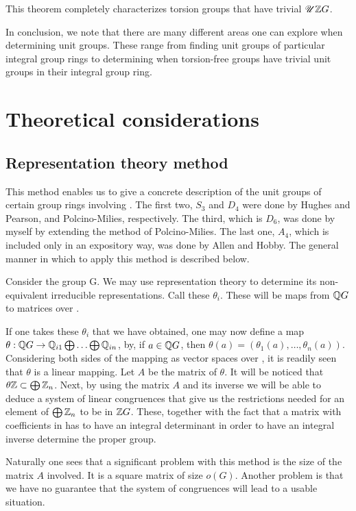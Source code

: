 \documentclass[11pt]{report}
\begin{document}
This theorem completely characterizes torsion groups that have trivial
\(\mathscr{U} \mathbb{Z}{}G\).

In conclusion, we note that there are many different areas one 
can explore when determining unit
groups.  These range from finding unit groups of particular 
integral group rings to determining when
torsion-free groups have trivial unit groups in their 
integral group ring.

\chapter{Theoretical considerations}
\section{Representation theory method}

This method enables us to give a concrete description of 
the unit groups of certain group rings
involving \integers.  The first two, $S_3$ and $D_4$ 
were done by Hughes and Pearson, and Polcino-Milies,
respectively. The third, which is $D_6$, was done 
by myself by extending the method of Polcino-Milies. 
The last one, $A_4$, which is included only in an 
expository way, was done by Allen and
Hobby. The general manner in which to apply this method is described below.

Consider the group G. We may use representation theory 
to determine its non-equivalent irreducible
representations. Call these $\theta{}_i$. These will be maps 
from \( \mathbb{Q}{}G\) to matrices over 
\rat.

If one takes these \(\theta{}_i\) that we have obtained, one may now define a map \(\theta:
 \mathbb{Q}{}G \rightarrow  \mathbb{Q}_{i1}\bigoplus\ldots\bigoplus  \mathbb{Q}_{in}\), by, if
\(a \in  \mathbb{Q}{}G\), then \(\theta(a) = (\theta_1(a),\ldots,\theta_n(a))\). 
Considering both sides of the mapping as vector spaces over \rat, it is readily seen that
$\theta$ is a linear mapping. Let $A$ be the matrix of $\theta$. It will be noticed that
\(\theta \mathbb{Z} \subset \bigoplus \mathbb{Z}_n\). Next, by using the matrix $A$ and its inverse we
will be able to deduce a system of linear congruences that give us the restrictions needed for an
element of \(\bigoplus \mathbb{Z}_n\) to be in \( \mathbb{Z}{}G\). These, together with the fact that a
matrix with coefficients in \integers{} has to have an integral determinant in order to have an
integral inverse determine the proper group.

Naturally one sees that a significant problem with this method is the size of the matrix $A$
involved. It is a square matrix of size \(o(G)\). Another problem is that we have no guarantee that the
system of congruences will lead to a usable situation.
\end{document}
